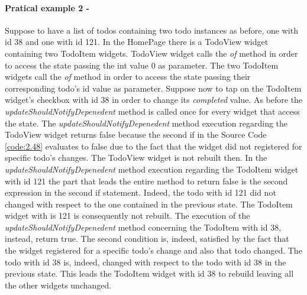 \paragraph{Pratical example 2 - } 
\label{subpar:todo_updating_feature_inherited_wdiget}
Suppose to have a list of todos containing two todo instances as before, one with id 38 and one with id 121. In the HomePage there is a TodoView widget containing two TodoItem widgets. TodoView widget calls the \textit{of} method in order to access the state passing the int value 0 as parameter. The two TodoItem widgets call the \textit{of} method in order to access the state passing their corresponding todo's id value as parameter. Suppose now to tap on the TodoItem widget's checkbox with id 38 in order to change its \textit{completed} value. As before the \textit{updateShouldNotifyDepenedent} method is called once for every widget that access the state. The \textit{updateShouldNotifyDepenedent} method execution regarding the TodoView widget returns false because the second if in the Source Code \ref{code:2.48} evaluates to false due to the fact that the widget did not registered for specific todo's changes. The TodoView widget is not rebuilt then. In the \textit{updateShouldNotifyDepenedent} method execution regarding the TodoItem widget with id 121 the part that leads the entire method to return false is the second expression in the second if statement. Indeed, the todo with id 121 did not changed with respect to the one contained in the previous state. The TodoItem widget with is 121 is consequently not rebuilt. The execution of the \textit{updateShouldNotifyDepenedent} method concerning the TodoItem with id 38, instead, return true. The second condition is, indeed, satisfied by the fact that the widget registered for a specific todo's change and also that todo changed. The todo with id 38 is, indeed, changed with respect to the todo with id 38 in the previous state. This leads the TodoItem widget with id 38 to rebuild leaving all the other widgets unchanged.


\mbox{}\\

